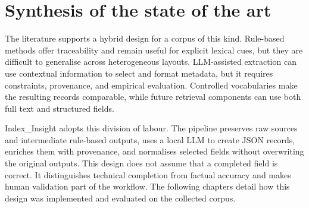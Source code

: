 \section{Synthesis of the state of the art}

The literature supports a hybrid design for a corpus of this kind. Rule-based
methods offer traceability and remain useful for explicit lexical cues, but they
are difficult to generalise across heterogeneous layouts. LLM-assisted
extraction can use contextual information to select and format metadata, but it
requires constraints, provenance, and empirical evaluation. Controlled
vocabularies make the resulting records comparable, while future retrieval
components can use both full text and structured fields.

Index\_Insight adopts this division of labour. The pipeline preserves raw
sources and intermediate rule-based outputs, uses a local LLM to create JSON
records, enriches them with provenance, and normalises selected fields without
overwriting the original outputs. This design does not assume that a completed
field is correct. It distinguishes technical completion from factual accuracy
and makes human validation part of the workflow. The following chapters detail
how this design was implemented and evaluated on the collected corpus.

